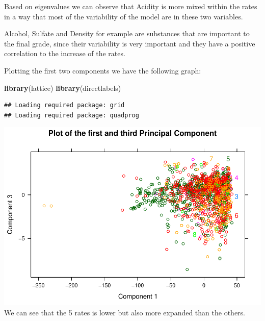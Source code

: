 \documentclass[]{article}
\newenvironment{Shaded}{\begin{snugshade}}{\end{snugshade}}
\newcommand{\KeywordTok}[1]{\textcolor[rgb]{0.13,0.29,0.53}{\textbf{{#1}}}}
\newcommand{\DataTypeTok}[1]{\textcolor[rgb]{0.13,0.29,0.53}{{#1}}}
\newcommand{\DecValTok}[1]{\textcolor[rgb]{0.00,0.00,0.81}{{#1}}}
\newcommand{\StringTok}[1]{\textcolor[rgb]{0.31,0.60,0.02}{{#1}}}
\newcommand{\NormalTok}[1]{{#1}}
\begin{document}
Based on eigenvalues we can observe that Acidity is more mixed within
the rates in a way that most of the variability of the model are in
these two variables.

Alcohol, Sulfate and Density for example are substances that are
important to the final grade, since their variability is very important
and they have a positive correlation to the increase of the rates.

Plotting the first two components we have the following graph:

\begin{Shaded}
\begin{Highlighting}[]
\KeywordTok{library}\NormalTok{(lattice)}
\KeywordTok{library}\NormalTok{(directlabels)}
\end{Highlighting}
\end{Shaded}

\begin{verbatim}
## Loading required package: grid
## Loading required package: quadprog
\end{verbatim}

\begin{Shaded}
\end{Shaded}

\includegraphics{Project_files/figure-latex/unnamed-chunk-14-1.pdf} We
can see that the 5 rates is lower but also more expanded than the
others.
\end{document}
